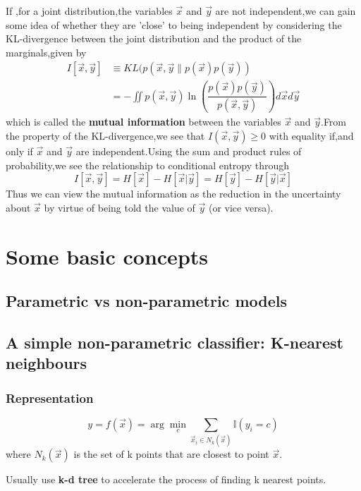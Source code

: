 If ,for a joint distribution,the variables $\vec{x}$ and $\vec{y}$ are not independent,we can gain some idea of whether they are 'close' to being independent by considering the KL-divergence between the joint distribution and the product of the marginals,given by
\begin{align}
I[\vec{x},\vec{y}] &\equiv KL(p(\vec{x},\vec{y}\parallel p(\vec{x})p(\vec{y})) \\
& = -\iint p(\vec{x},\vec{y})\ln (\dfrac{p(\vec{x})p(\vec{y})}{p(\vec{x},\vec{y})})d\vec{x}d\vec{y}
\end{align}
which is called the \textbf{mutual information} between the variables $\vec{x}$ and $\vec{y}$.From the property of the KL-divergence,we see that $I(\vec{x},\vec{y}) \geq 0$ with equality if,and only if $\vec{x}$ and $\vec{y}$ are independent.Using the sum and product rules of probability,we see the relationship to conditional entropy through
\begin{equation}
I[\vec{x},\vec{y}] = H[\vec{x}] - H[\vec{x}|\vec{y}] = H[\vec{y}] - H[\vec{y}|\vec{x}]
\end{equation}
Thus we can view the mutual information as the reduction in the uncertainty about $\vec{x}$ by virtue of being told the value of $\vec{y}$ (or vice versa).


\section{Some basic concepts}

\subsection{Parametric vs non-parametric models}


\subsection{A simple non-parametric classifier: K-nearest neighbours}

\subsubsection{Representation}
\begin{equation}
y=f(\vec{x})=\arg\min_{c}{\sum\limits_{\vec{x}_i \in N_k(\vec{x})} \mathbb{I}(y_i=c)}
\end{equation}
where $N_k(\vec{x})$ is the set of k points that are closest to point $\vec{x}$.

Usually use \textbf{k-d tree} to accelerate the process of finding k nearest points.

